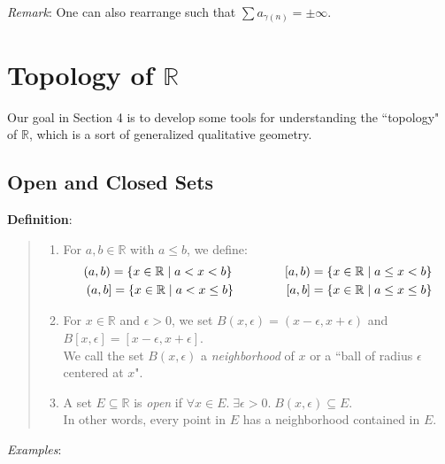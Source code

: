 \documentclass[11pt]{article}
\begin{document}
\emph{Remark}: One can also rearrange such that $\sum a_{\gamma(n)} = \pm \infty$.

\newpage

\section{Topology of $\mathbb{R}$}

Our goal in Section 4 is to develop some tools for understanding the ``topology" of $\mathbb{R}$, which is a sort of generalized qualitative geometry.

\subsection{Open and Closed Sets}

\textbf{Definition}:
\begin{quote}\vspace{-0.3cm}
\begin{enumerate}
	\item For $a,b \in \mathbb{R}$ with $a \leq b$, we define:
	\begin{align*}
		(a,b) = \{x \in \mathbb{R} \;|\; a < x < b\} \hspace{1.5cm} [a, b) = \{x \in \mathbb{R} \;|\; a \leq x < b\}\\
		(a,b] = \{x \in \mathbb{R} \;|\; a < x \leq b\} \hspace{1.5cm} [a,b] = \{x \in \mathbb{R} \;|\; a \leq x \leq b\}
	\end{align*}

	\item For $x \in \mathbb{R}$ and $\epsilon > 0$, we set $B(x, \epsilon) = (x-\epsilon, x + \epsilon)$ and $B[x, \epsilon] = [x-\epsilon, x + \epsilon]$.\\
	We call the set $B(x, \epsilon)$ a \emph{neighborhood} of $x$ or a ``ball of radius $\epsilon$ centered at $x$".

	\item A set $E \subseteq \mathbb{R}$ is \emph{open} if $\forall x \in E.\; \exists \epsilon > 0.\; B(x, \epsilon) \subseteq E$.\\
	In other words, every point in $E$ has a neighborhood contained in $E$.
\end{enumerate}
\end{quote}
\emph{Examples}:
\end{document}
